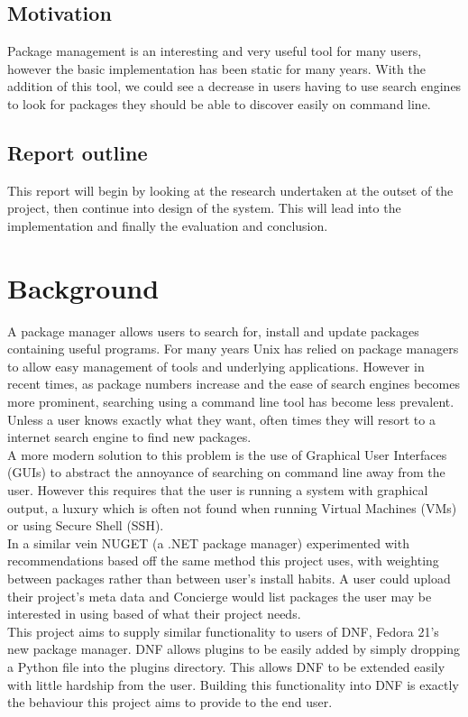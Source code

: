 \documentclass{l4proj}
\begin{document}
\section{Motivation}
Package management is an interesting and very useful tool for many users, however the basic implementation has been static for many years. With the addition of this tool, we could see a decrease in users having to use search engines to look for packages they should be able to discover easily on command line.

\section{Report outline}
This report will begin by looking at the research undertaken at the outset of the project, then continue into design of the system. This will lead into the implementation and finally the evaluation and conclusion.
 
 
\chapter{Background}
A package manager allows users to search for, install and update packages containing useful programs. For many years Unix has relied on package managers to allow easy management of tools and underlying applications. However in recent times, as package numbers increase and the ease of search engines becomes more prominent, searching using a command line tool has become less prevalent. Unless a user knows exactly what they want, often times they will resort to a internet search engine to find new packages.\\
A more modern solution to this problem is the use of Graphical User Interfaces (GUIs) to abstract the annoyance of searching on command line away from the user. However this requires that the user is running a system with graphical output, a luxury which is often not found when running Virtual Machines (VMs) or using Secure Shell (SSH).\\
In a similar vein NUGET (a .NET package manager) experimented with recommendations based off the same method this project uses, with weighting between packages rather than between user's install habits. A user could upload their project's meta data and Concierge would list packages the user may be interested in using based of what their project needs.\\
This project aims to supply similar functionality to users of DNF, Fedora 21's new package manager. DNF allows plugins to be easily added by simply dropping a Python file into the plugins directory. This allows DNF to be extended easily with little hardship from the user. Building this functionality into DNF is exactly the behaviour this project aims to provide to the end user.\\ 
\end{document}
